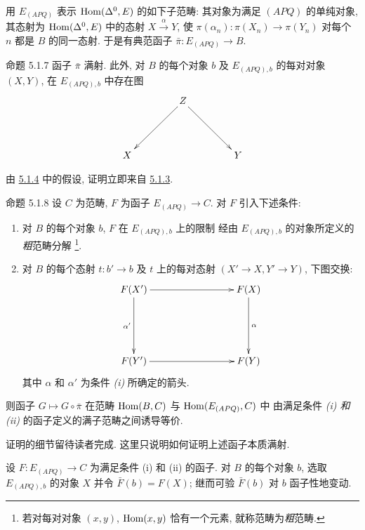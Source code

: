 \setcounter{subsubsection}{5}
\subsubsection{}
用 $E_{(APQ)}$ 表示 $\operatorname{Hom}(\Delta^0,E)$ 的如下子范畴:
其对象为满足 $(APQ)$ 的单纯对象,
其态射为 $\operatorname{Hom}(\Delta^0,E)$ 中的态射 $X\xrightarrow{\alpha}Y$,
使 $\pi(\alpha_n):\pi(X_n)\to\pi(Y_n)$ 对每个 $n$ 都是 $B$ 的同一态射.
于是有典范函子 $\bar{\pi}:E_{(APQ)}\to B$.

\begin{enonce*}{命题 5.1.7}
函子\pageoriginale{} $\bar{\pi}$ 满射.
此外, 对 $B$ 的每个对象 $b$ 及 $E_{(APQ),b}$ 的每对对象 $(X,Y)$,
在 $E_{(APQ),b}$ 中存在图
\[
\xymatrix@=1.5cm{
  & Z \ar[ld]\ar[rd]&\\
X &   & Y
}
\]
\end{enonce*}

由 \hyperref[Vbis.subsubsec5.1.4]{5.1.4} 中的假设,
证明立即来自 \hyperref[Vbis.prop5.1.3]{5.1.3}.

\begin{enonce*}{命题 5.1.8}
设 $C$ 为范畴, $F$ 为函子 $E_{(APQ)}\to C$.
对 $F$ 引入下述条件:
\begin{enumerate}
\renewcommand{\theenumi}{\roman{enumi}}
\renewcommand{\labelenumi}{(\theenumi)}
\item 对 $B$ 的每个对象 $b$, $F$ 在 $E_{(APQ),b}$ 上的限制
经由 $E_{(APQ),b}$ 的对象所定义的\emph{粗}范畴分解
\footnote{若对每对对象 $(x,y)$, $\operatorname{Hom}(x,y)$ 恰有一个元素, 就称范畴为\emph{粗}范畴.}.

\item 对 $B$ 的每个态射 $t:b'\to b$
及 $t$ 上的每对态射 $(X'\to X,Y'\to Y)$, 下图交换:
\[
\xymatrix@C=3cm@R=2cm{
F(X')         \ar[r]  \ar[d]_{\alpha'}& F(X)\ar[d]^{\alpha}\\
F(Y')          \ar[r] & F(Y)
}
\]
其中 $\alpha$ 和 $\alpha'$ 为条件 \emph{(i)} 所确定的箭头.
\end{enumerate}

则函子 $G\mapsto G\circ\bar{\pi}$
在范畴 $\operatorname{Hom}(B,C)$ 与 $\operatorname{Hom}(E_{(APQ)},C)$ 中
由满足条件 \emph{(i) 和 (ii)} 的函子定义的满子范畴之间诱导等价.
\end{enonce*}

证明的\pageoriginale{}细节留待读者完成.
这里只说明如何证明上述函子本质满射.

设 $F:E_{(APQ)}\to C$ 为满足条件 (i) 和 (ii) 的函子.
对 $B$ 的每个对象 $b$, 选取 $E_{(APQ),b}$ 的对象 $X$ 并令 $\bar{F}(b)=F(X)$;
继而可验 $\bar{F}(b)$ 对 $b$ 函子性地变动.


